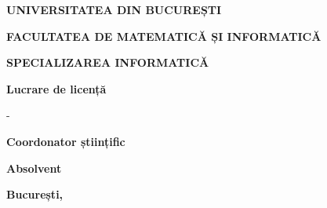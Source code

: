 \begin{titlepage}
    \begin{center}
        \large
        \textbf{\MakeUppercase{Universitatea din București}}
        
        \textbf{\MakeUppercase{Facultatea de Matematică și Informatică}}
        
        \textbf{\MakeUppercase{Specializarea Informatică}}
        
        \vspace{3.5cm}
        
        \textbf{Lucrare de licență}
        
        \huge
        \textbf{\thesistitle}
        
        \large
        -\\
        \textbf{\thesissubtitle}
        
        \vspace{7.5cm}
        
        \begin{minipage}{7cm}
            \textbf{Coordonator științific}\\
            \textbf{\prof}
        \end{minipage}
        \hfill
        \begin{minipage}{3.3cm}
            \textbf{Absolvent}\\
            \textbf{\student}
        \end{minipage}
        
        \vfill
        \textbf{București, \session}
        
    \end{center}
\end{titlepage}
